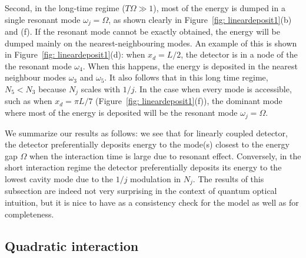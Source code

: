 \documentclass[prd,twocolumn,superscriptaddress,nofootinbib,floatfix,amsmath,amssymb]{revtex4-2}
\begin{document}
    Second, in the long-time regime ($T\Omega\gg 1$), most of the energy is dumped in a single resonant mode $\omega_j = \Omega$, as shown clearly in Figure~\ref{fig: lineardeposit1}(b) and (f). If the resonant mode cannot be exactly obtained, the energy will be dumped mainly on the nearest-neighbouring modes. An example of this is shown in Figure~\ref{fig: lineardeposit1}(d): when $x_d=L/2$, the detector is in a node of the the resonant mode $\omega_4$. When this happens, the energy is deposited in the nearest neighbour modes $\omega_3$ and $\omega_5$. It also follows that in this long time regime, $N_5<N_3$ because $N_j$ scales with $1/j$. In the case when every mode is accessible, such as when $x_d = \pi L/7$ (Figure~\ref{fig: lineardeposit1}(f)), the dominant mode where most of the energy is deposited will be the resonant mode $\omega_j=\Omega$.
    
    
    We summarize our results as follows: we see that for linearly coupled detector, the detector preferentially deposits energy to the mode(s) closest to the energy gap $\Omega$ when the interaction time is large due to resonant effect. Conversely, in the short interaction regime the detector preferentially deposits its energy to the lowest cavity mode due to the $1/j$ modulation in $N_j$. The results of this subsection are indeed not very surprising in the context of quantum optical intuition, but it is nice to have as a consistency check for the model as well as for completeness.

        
    

    \subsection{Quadratic interaction}
    
\end{document}
